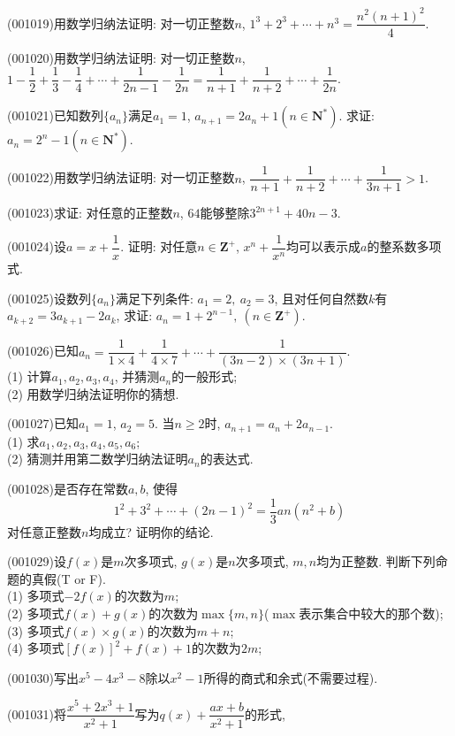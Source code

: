 \item (001019)用数学归纳法证明: 对一切正整数$n$, $1^3+2^3+\cdots+n^3=\dfrac{n^2(n+1)^2}{4}$.
\item (001020)用数学归纳法证明: 对一切正整数$n$, $1-\dfrac{1}{2}+\dfrac{1}{3}-\dfrac{1}{4}+\cdots+\dfrac{1}{2n-1}-\dfrac{1}{2n}=\dfrac{1}{n+1}+\dfrac{1}{n+2}+\cdots+\dfrac{1}{2n}$.
\item (001021)已知数列$\{a_n\}$满足$a_1=1$, $a_{n+1}=2a_n+1(n\in\mathbf{N}^*)$. 求证:$a_n=2^n-1(n\in\mathbf{N}^*)$.
\item (001022)用数学归纳法证明: 对一切正整数$n$, $\dfrac{1}{n+1}+\dfrac{1}{n+2}+\cdots+\dfrac{1}{3n+1}>1$.
\item (001023)求证: 对任意的正整数$n$, $64$能够整除$3^{2n+1}+40n-3$.
\item (001024)设$a=x+\dfrac{1}{x}$. 证明: 对任意$n \in \mathbf{Z}^+$, $x^n+\dfrac{1}{x^n}$均可以表示成$a$的整系数多项式.
\item (001025)设数列$\{a_n\}$满足下列条件: $a_1=2,\ a_2=3$, 且对任何自然数$k$有$a_{k+2}=3a_{k+1}-2a_k$, 求证: $a_n=1+2^{n-1}, \ (n \in \mathbf{Z}^+)$.
\item (001026)已知$a_n=\dfrac{1}{1\times 4}+\dfrac{1}{4\times 7}+\cdots+\dfrac{1}{(3n-2)\times(3n+1)}$.\\ 
(1) 计算$a_1,a_2,a_3,a_4$, 并猜测$a_n$的一般形式;\\ 
(2) 用数学归纳法证明你的猜想.
\item (001027)已知$a_1=1$, $a_2=5$. 当$n \ge 2$时, $a_{n+1}=a_n+2a_{n-1}$.\\ 
(1) 求$a_1,a_2,a_3,a_4,a_5,a_6$;\\ 
(2) 猜测并用第二数学归纳法证明$a_n$的表达式.
\item (001028)是否存在常数$a,b$, 使得
$$1^2+3^2+\cdots+(2n-1)^2=\dfrac{1}{3}an(n^2+b)$$
对任意正整数$n$均成立? 证明你的结论.
\item (001029)设$f(x)$是$m$次多项式, $g(x)$是$n$次多项式, $m,n$均为正整数. 判断下列命题的真假(T or F).\\ 
 (1) 多项式$-2f(x)$的次数为$m$;\\ 
 (2) 多项式$f(x)+g(x)$的次数为$\max\{m,n\}$($\max$表示集合中较大的那个数);\\ 
 (3) 多项式$f(x)\times g(x)$的次数为$m+n$;\\ 
 (4) 多项式$[f(x)]^2+f(x)+1$的次数为$2m$;
\item (001030)写出$x^5-4x^3-8$除以$x^2-1$所得的商式和余式(不需要过程).
\item (001031)将$\dfrac{x^5 + 2 x^3 + 1}{x^2+1}$写为$q(x)+\dfrac{ax+b}{x^2+1}$的形式,
